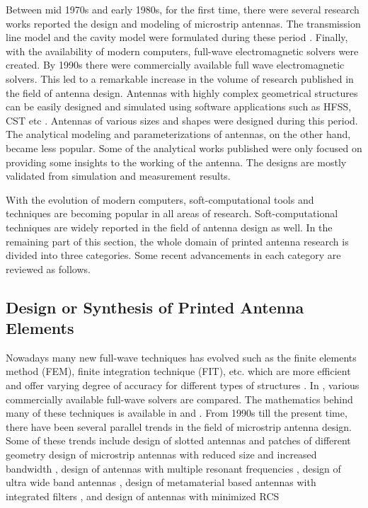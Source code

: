 Between mid 1970s and early 1980s, for the first time, there were several research works reported the design and modeling of microstrip antennas. The transmission line model and the cavity model were formulated during these period \cite{handbook}. Finally, with the availability of modern computers, full-wave electromagnetic solvers were created. By 1990s there were commercially available full wave electromagnetic solvers. This led to a remarkable increase in the volume of research published in the field of antenna design. Antennas with highly complex geometrical structures can be easily designed and simulated using software applications such as HFSS{\circledR}, CST{\circledR} etc \cite{practGuide3D}. Antennas of various sizes and shapes were designed during this period. The analytical modeling and parameterizations of antennas, on the other hand, became less popular. Some of the analytical works published were only focused on providing some insights to the working of the antenna. The designs are mostly validated from simulation and measurement results.

With the evolution of modern computers, soft-computational tools and techniques are becoming popular in all areas of research. Soft-computational techniques are widely reported in the field of antenna design as well. In the remaining part of this section, the whole domain of printed antenna research is divided into three categories. Some recent advancements in each category are reviewed as follows.

\subsection{Design or Synthesis of Printed Antenna Elements}
Nowadays many new full-wave techniques has evolved such as the finite elements method (FEM), finite integration technique (FIT), etc. which are more efficient and offer varying degree of accuracy for different types of structures \cite{practGuide3D}. In \cite{practGuide3D}, various commercially available full-wave solvers are compared. The mathematics behind many of these techniques is available in \cite{handbook} and \cite{numericalbook}. From 1990s till the present time, there have been several parallel trends in the field of microstrip antenna design. Some of these trends include design of slotted antennas and patches of different geometry \cite{HPatch1, uslot1} design of microstrip antennas with reduced size and increased bandwidth \cite{smallPatch0, BandSize0}, design of antennas with multiple resonant frequencies \cite{dualBandPatch1, dualBandCircPol,fractal1}, design of ultra wide band antennas \cite{slottedUWB, PMA01}, design of metamaterial based antennas with integrated filters \cite{bandnotchCSRR1, bandnotchEBG1}, and design of antennas with minimized RCS \cite{rcs1992, rcs2014, rcs2016}

